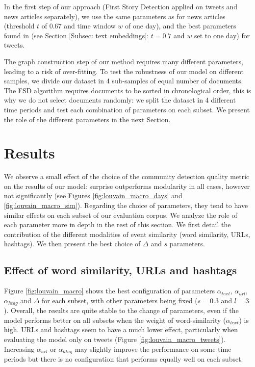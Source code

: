 In the first step of our approach (First Story Detection applied on tweets and news articles separately), we use the same parameters as \cite{cage2020production} for news articles (threshold $t$ of $0.67$ and time window $w$ of one day), and the best parameters found in  \cite{mazoyer2020french} (see Section \ref{Subsec: text embeddings}: $t=0.7$ and $w$ set to one day) for tweets.

The graph construction step of our method requires many different parameters, leading to a risk of over-fitting. To test the robustness of our model on different samples, we divide our dataset in 4 sub-samples of equal number of documents. The FSD algorithm requires documents to be sorted in chronological order, this is why we do not select documents randomly: we split the dataset in 4 different time periods and test each combination of parameters on each subset. We present the role of the different parameters in the next Section.

\section{Results}


We observe a small effect of the choice of the community detection quality metric on the results of our model: surprise outperforms modularity in all cases, however not significantly (see Figures \ref{fig:louvain_macro_days} and \ref{fig:louvain_macro_sim}). Regarding the choice of parameters, they tend to have similar effects on each subset of our evaluation corpus. We analyze the role of each parameter more in depth in the rest of this section. We first detail the contribution of the different modalities of event similarity (word similarity, URLs, hashtags). We then present the best choice of $\Delta$ and $s$ parameters.

\subsection{Effect of word similarity, URLs and hashtags}
Figure \ref{fig:louvain_macro} shows 
the best configuration of parameters $\alpha_{text}$, $\alpha_{url}$, $\alpha_{htag}$ and $\Delta$ for each subset, with other parameters being fixed ($s = 0.3$ and $l = 3$). Overall, the results are quite stable to the change of parameters, even if the model performs better on all subsets when the weight of word-similarity ($\alpha_{text}$) is high. URLs and hashtags seem to have a much lower effect, particularly when evaluating the model only on tweets (Figure \ref{fig:louvain_macro_tweets}). Increasing $\alpha_{url}$ or $\alpha_{htag}$ may slightly improve the performance on some time periods  but there is no configuration that performs equally well on each subset.


